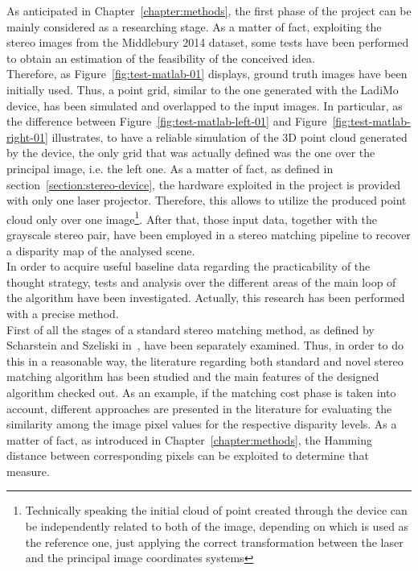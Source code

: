 As anticipated in Chapter~\ref{chapter:methods}, the first phase of the project can be mainly considered as a researching stage.
As a matter of fact, exploiting the stereo images from the Middlebury 2014 dataset, some tests have been performed to obtain an estimation of the feasibility of the conceived idea.\\
Therefore, as Figure~\ref{fig:test-matlab-01} displays, ground truth images have been initially used.
Thus, a point grid, similar to the one generated with the LadiMo device, has been simulated and overlapped to the input images.
In particular, as the difference between Figure~\ref{fig:test-matlab-left-01} and Figure~\ref{fig:test-matlab-right-01} illustrates, to have a reliable simulation of the 3D point cloud generated by the device, the only grid that was actually defined was the one over the principal image, i.e. the left one.
As a matter of fact, as defined in section~\ref{section:stereo-device}, the hardware exploited in the project is provided with only one laser projector.
Therefore, this allows to utilize the produced point cloud only over one image\footnote{Technically speaking the initial cloud of point created through the device can be independently related to both of the image, depending on which is used as the reference one, just applying the correct transformation between the laser and the principal image coordinates systems}.
After that, those input data, together with the grayscale stereo pair, have been employed in a stereo matching pipeline to recover a disparity map of the analysed scene.\\
In order to acquire useful baseline data regarding the practicability of the thought strategy, tests and analysis over the different areas of the main loop of the algorithm have been investigated.
Actually, this research has been performed with a precise method. \\
First of all the stages of a standard stereo matching method, as defined by Scharstein and Szeliski in~\cite{Scharstein2001}, have been separately examined. 
Thus, in order to do this in a reasonable way, the literature regarding both standard and novel stereo matching algorithm has been studied and the main features of the designed algorithm checked out. 
As an example, if the matching cost phase is taken into account, different approaches are presented in the literature for evaluating the similarity among the image pixel values for the respective disparity levels. 
As a matter of fact, as introduced in Chapter~\ref{chapter:methods}, the Hamming distance between corresponding pixels can be exploited to determine that measure. 
